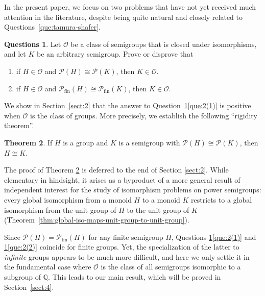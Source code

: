 \documentclass[11pt,reqno]{amsart}
\theoremstyle{definition}
\newtheorem{theorem}{Theorem}[section]
\newtheorem{questions}[theorem]{Questions}
\theoremstyle{remark}
\theoremstyle{theoremdd}
\newcommand{\fin}{\mathrm{fin}}
\renewcommand{\,}{\kern 0.1em}
\begin{document}
In the present paper, we focus on two problems that
have not yet received much attention in the literature, despite
being quite natural and closely related to
Questions~\ref{que:tamura-shafer}.



\begin{questions}
\label{que:2}
Let $\mathcal O$ be a class of semigroups that is closed under isomorphisms, and let $K$ be an arbitrary semigroup. Prove or disprove that 
\begin{enumerate}[label=\textup{(\arabic{*})}]
\item\label{que:2(1)} if $H \in \mathcal O$ and $\mathcal P(H) \cong \mathcal P(K)$, then $K \in \mathcal O$.
\item\label{que:2(2)} if $H \in \mathcal O$ and $\mathcal P_\fin(H) \cong \mathcal P_\fin(K)$, then $K \in \mathcal O$.
\end{enumerate}
\end{questions}


We show in Section~\ref{sect:2} that the answer to
Question~\ref{que:2}\ref{que:2(1)} is positive when
$\mathcal O$ is the class of groups. More precisely, we establish the following ``rigidity theorem''.

\begin{theorem}
\label{thm:groups-are-P-closed}
If $H$ is a group and $K$ is a semigroup with $\mathcal P(H) \cong \mathcal P(K)$, then $H \cong K$.
\end{theorem}

The proof of Theorem \ref{thm:groups-are-P-closed} is deferred to the end of Section \ref{sect:2}. While elementary in hindsight, it arises as a byproduct of a more general result of independent interest for the study of isomorphism problems on power semigroups: every global isomorphism from a monoid $H$ to a monoid $K$ restricts to a global isomorphism from the unit group of $H$ to the unit group of $K$ (Theorem~\ref{thm:global-iso-maps-unit-group-to-unit-group}).

Since $\mathcal P(H) = \mathcal P_\fin(H)$ for any finite semigroup $H$, Questions \ref{que:2}\ref{que:2(1)} and \ref{que:2}\ref{que:2(2)} coincide for finite groups. Yet, the specialization of the latter to \textit{infinite} groups appears to be much more difficult, and here we only settle it in the fundamental case where $\mathcal O$ is the class of all semigroups isomorphic to a subgroup of $\mathbb Q$. This leads to our main result, which will be proved in Section~\ref{sect:4}.
\end{document}
